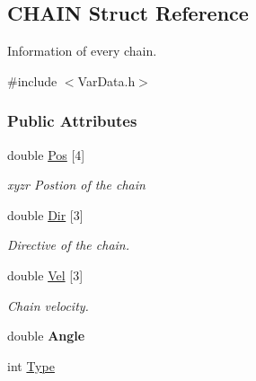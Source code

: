 \hypertarget{structCHAIN}{}\subsection{C\+H\+A\+IN Struct Reference}
\label{structCHAIN}


Information of every chain.  




{\ttfamily \#include $<$Var\+Data.\+h$>$}

\subsubsection*{Public Attributes}
\begin{DoxyCompactItemize}
\item 
double \hyperlink{structCHAIN_ac00d29ea47aa8845638961a34cb3ec0e}{Pos} \mbox{[}4\mbox{]}\hypertarget{structCHAIN_ac00d29ea47aa8845638961a34cb3ec0e}{}\label{structCHAIN_ac00d29ea47aa8845638961a34cb3ec0e}

\begin{DoxyCompactList}\small\item\em xyzr Postion of the chain \end{DoxyCompactList}\item 
double \hyperlink{structCHAIN_ac77c91979738079508cf3f257a7164ba}{Dir} \mbox{[}3\mbox{]}\hypertarget{structCHAIN_ac77c91979738079508cf3f257a7164ba}{}\label{structCHAIN_ac77c91979738079508cf3f257a7164ba}

\begin{DoxyCompactList}\small\item\em Directive of the chain. \end{DoxyCompactList}\item 
double \hyperlink{structCHAIN_ae3fae9edc78d8cadc33c5a52bebdb46c}{Vel} \mbox{[}3\mbox{]}\hypertarget{structCHAIN_ae3fae9edc78d8cadc33c5a52bebdb46c}{}\label{structCHAIN_ae3fae9edc78d8cadc33c5a52bebdb46c}

\begin{DoxyCompactList}\small\item\em Chain velocity. \end{DoxyCompactList}\item 
double {\bfseries Angle}\hypertarget{structCHAIN_a8c10230001bab42de01beb2843f8c327}{}\label{structCHAIN_a8c10230001bab42de01beb2843f8c327}

\item 
int \hyperlink{structCHAIN_ae011432eaca3858364b05a111f4011d3}{Type}\hypertarget{structCHAIN_ae011432eaca3858364b05a111f4011d3}{}\label{structCHAIN_ae011432eaca3858364b05a111f4011d3}


\end{DoxyCompactItemize}
